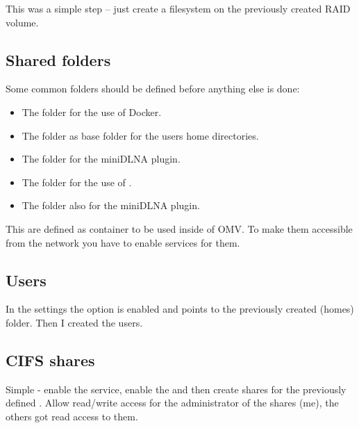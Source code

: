 This was a simple step -- just create a filesystem on the previously created
RAID volume.


\subsection{Shared folders}\label{subsec:Shared folders}

Some common folders should be defined before anything else is done:

\begin{itemize}
    \item The folder  for the use of \gls{Docker}.
    \item The folder  as base folder for the users home directories.
    \item The folder  for the miniDLNA plugin.
    \item The folder  for the use of .
    \item The folder  also for the miniDLNA plugin.
\end{itemize}


This  are defined as container to be used inside
of \gls{OMV}. To make them accessible from the network you have to enable
services for them.

\subsection{Users}

In the settings the option  is enabled and
points to the previously created \tsFontCode(homes) folder. Then I created
the users.


\subsection{CIFS shares}

Simple - enable the  service, enable the  and then create shares for the previously defined . Allow read/write access for the administrator of the shares (me),
the others got read access to them.

